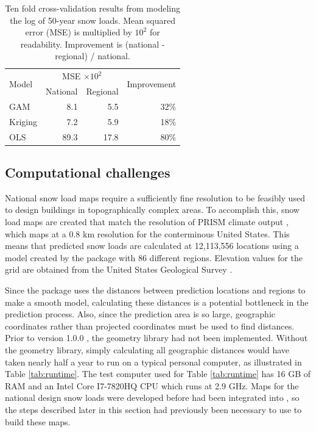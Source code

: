 \begin{table}[htbp]
    \centering
    \begin{tabular}{lrrr}
        \toprule
        \multirow{2}{*}{Model} & \multicolumn{2}{c}{MSE $\times10^2$} & \multirow{2}{*}{Improvement}\\
        \cline{2-3}
        & National & Regional & \\
        \midrule
        GAM & 8.1 & 5.5 & 32\%\\
        Kriging & 7.2 & 5.9 & 18\%\\
        OLS & 89.3 & 17.8 & 80\%\\
        \bottomrule
    \end{tabular}
    \caption{Ten fold cross-validation results from modeling the log of 50-year snow loads. Mean squared error (MSE) is multiplied by $10^2$ for readability. Improvement is (national - regional) / national.}
    \label{tab:standard_cv_50}
\end{table}

\subsection{Computational challenges}

National snow load maps require a sufficiently fine resolution to be feasibly used to design buildings in topographically complex areas. To accomplish this, snow load maps are created that match the resolution of PRISM climate output \citep{prism2020}, which maps at a 0.8 km resolution for the conterminous United States. This means that predicted snow loads are calculated at 12,113,556 locations using a model created by the  package with 86 different regions. Elevation values for the grid are obtained from the United States Geological Survey \citep{USGS2020}.

Since the  package uses the distances between prediction locations and regions to make a smooth model, calculating these distances is a potential bottleneck in the prediction process. Also, since the prediction area is so large, geographic coordinates rather than projected coordinates must be used to find distances. Prior to  version 1.0.0 \citep{pebesma2018}, the  geometry library \citep{google2020} had not been implemented. Without the  geometry library, simply calculating all geographic distances would have taken nearly half a year to run on a typical personal computer, as illustrated in Table \ref{tab:runtime}. The test computer used for Table \ref{tab:runtime} has 16 GB of RAM and an Intel Core I7-7820HQ CPU which runs at 2.9 GHz. Maps for the national design snow loads were developed before  had been integrated into , so the steps described later in this section had previously been necessary to use  to build these maps.

